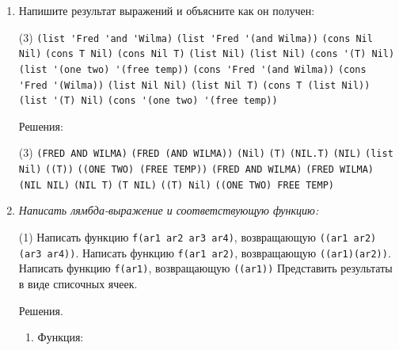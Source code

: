 \begin{enumerate}[wide=0pt]
Решения:
\begin{tasks}[label=\arabic*), item-indent=3pt, after-item-skip=1pt, column-sep=20pt](2)
	\task \lstinline{RED}
	\task \lstinline{Nil}
	\task \lstinline{(DEF)}
	\task \lstinline{(GHI)}
\end{tasks}
\item Напишите результат выражений и объясните как он получен:
\begin{tasks}[label=\arabic*), item-indent=3pt, label-offset=10pt, after-item-skip=1pt](3)
	\task \lstinline{(list 'Fred 'and 'Wilma)}
	\task \lstinline{(list 'Fred '(and Wilma))}
	\task \lstinline{(cons Nil Nil)}
	\task \lstinline{(cons T Nil)}
	\task \lstinline{(cons Nil T)}
	\task \lstinline{(list Nil)}
	\task \lstinline{(list Nil)}
	\task \lstinline{(cons '(T) Nil)}
	\task \lstinline{(list '(one two) '(free temp))}
	\task \lstinline{(cons 'Fred '(and Wilma))}
	\task \lstinline{(cons 'Fred '(Wilma))}
	\task \lstinline{(list Nil Nil)}
	\task \lstinline{(list Nil T)}
	\task \lstinline{(cons T (list Nil))}
	\task \lstinline{(list '(T) Nil)}
	\task \lstinline{(cons '(one two) '(free temp))}
\end{tasks}
Решения:
\begin{tasks}[label=\arabic*), item-indent=3pt, label-offset=10pt, after-item-skip=1pt](3)
	\task \lstinline{(FRED AND WILMA)}
	\task \lstinline{(FRED (AND WILMA))}
	\task \lstinline{(Nil)}
	\task \lstinline{(T)}
	\task \lstinline{(NIL.T)}
	\task \lstinline{(NIL)}
	\task \lstinline{(list Nil)}
	\task \lstinline{((T))}
	\task \lstinline{((ONE TWO) (FREE TEMP))}
	\task \lstinline{(FRED AND WILMA)}
	\task \lstinline{(FRED WILMA)}
	\task \lstinline{(NIL NIL)}
	\task \lstinline{(NIL T)}
	\task \lstinline{(T NIL)}
	\task \lstinline{((T) Nil)}
	\task \lstinline{((ONE TWO) FREE TEMP)}
\end{tasks}
\item \textit{Написать лямбда-выражение и соответствующую функцию:}
\begin{tasks}[label=\arabic*), item-indent=3pt, label-offset=10pt, after-item-skip=1pt](1)
	\task Написать функцию \lstinline{f(ar1 ar2 ar3 ar4)}, возвращающую \lstinline{((ar1 ar2) (ar3 ar4))}.
	\task Написать функцию \lstinline{f(ar1 ar2)}, возвращающую \lstinline{((ar1)(ar2))}.
	\task Написать функцию \lstinline{f(ar1)}, возвращающую \lstinline{((ar1))}
	\task[~] Представить результаты в виде списочных ячеек.
\end{tasks}
Решения.
\begin{enumerate}[label=\arabic*.,wide=0pt]
\item Функция:

\end{enumerate}
\end{enumerate}

